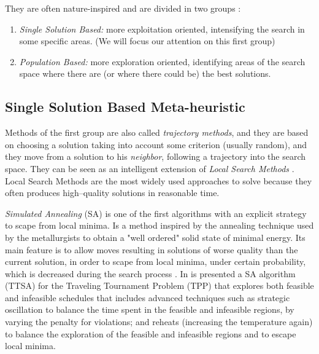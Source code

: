 They are often nature-inspired and are divided in two groups \cite{Boussaid2013}: 
\begin{enumerate}%
    \item {\it Single Solution Based:} more exploitation oriented, intensifying the search in some specific areas. (We will focus our attention on this first group)
    \item {\it Population Based:} more exploration oriented, identifying areas of the search space where there are (or where there could be) the best solutions. %
\end{enumerate} %

\subsection{Single Solution Based Meta-heuristic}

Methods of the first group are also called {\it trajectory methods}, and they are based on choosing a solution taking into account some criterion (usually random), and they move from a solution to his \textit{neighbor}, following a trajectory into the search space. They can be seen as an intelligent extension of \textit{Local Search Methods} \cite{Boussaid2013}. Local Search Methods are the most widely used approaches to solve \COPs{} because they often produces high--quality solutions in reasonable time.
  
{\it Simulated Annealing} (SA) \cite{Nikolaev2010} is one of the first algorithms with an explicit strategy to scape from local minima. Is a method inspired by the annealing technique used by the metallurgists to obtain a "well ordered" solid state of minimal energy. Its main feature is to allow moves resulting in solutions of worse quality than the current solution, in order to scape from local minima, under certain probability, which is decreased during the search process \cite{Blum2003}. In \cite{Anagnostopoulos2006} is presented a SA algorithm (TTSA) for the Traveling Tournament Problem (TPP) that explores both feasible and infeasible schedules that includes advanced techniques such as strategic oscillation to balance the time spent in the feasible and infeasible regions, by varying the penalty for violations; and reheats (increasing the temperature again) to balance the exploration of the feasible and infeasible regions and to escape local minima.

